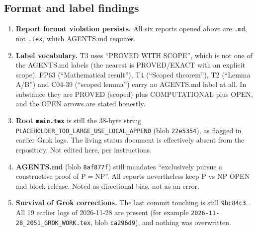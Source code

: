\documentclass[11pt]{article}
\begin{document}
\subsection*{Format and label findings}
\begin{enumerate}
\item \textbf{Report format violation persists.} All six reports opened above are \texttt{.md}, not \texttt{.tex}, which AGENTS.md requires.
\item \textbf{Label vocabulary.} T3 uses ``PROVED WITH SCOPE'', which is not one of the AGENTS.md labels (the nearest is PROVED/EXACT with an explicit scope).
FP63 (``Mathematical result''), T4 (``Scoped theorem''), T2 (``Lemma A/B'') and C04-39 (``scoped lemma'') carry no AGENTS.md label at all.
In substance they are PROVED (scoped) plus COMPUTATIONAL plus OPEN, and the OPEN arrows are stated honestly.
\item \textbf{Root \texttt{main.tex}} is still the 38-byte string \texttt{PLACEHOLDER\_TOO\_LARGE\_USE\_LOCAL\_APPEND} (blob \texttt{22e5354}), as flagged in
earlier Grok logs. The living status document is effectively absent from the repository. Not edited here, per instructions.
\item \textbf{AGENTS.md} (blob \texttt{8af877f}) still mandates ``exclusively pursue a constructive proof of P$=$NP''. All reports nevertheless keep
P vs NP OPEN and block release. Noted as directional bias, not as an error.
\item \textbf{Survival of Grok corrections.} The last commit touching  is still \texttt{9bc84c3}. All 19 earlier
logs of 2026-11-28 are present (for example \texttt{2026-11-28\_2051\_GROK\_WORK.tex}, blob \texttt{ca296d9}), and nothing was overwritten.
\end{enumerate}
\end{document}
